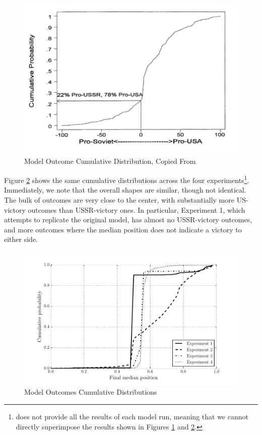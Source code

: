 \begin{figure}[h!]
  \centering
  \includegraphics[scale=0.75]{ColdWar/Figures/ColdWarOriginal}
  \caption[Original Model Cumulative Distribution]{Model Outcome Cumulative Distribution, Copied From \citet{bdm_1998} }
  \label{fig:original_cdf}
  \figSpace
 \end{figure}

Figure \ref{fig:new_cdfs} shows the same cumulative distributions across the four experiments\footnote{\citet{bdm_1998} does not provide all the results of each model run, meaning that we cannot directly superimpose the results shown in Figures \ref{fig:original_cdf} and \ref{fig:new_cdfs}.}. Immediately, we note that the overall shapes are similar, though not identical. The bulk of outcomes are very close to the center, with substantially more US-victory outcomes than USSR-victory ones. In particular, Experiment 1, which attempts to replicate the original model, has almost no USSR-victory outcomes, and more outcomes where the median position does not indicate a victory to either side.

\begin{figure}[h!]
  \centering
  \includegraphics[scale=0.5]{ColdWar/Figures/Model_cdfs}
  \caption[New Model Cumulative Distribution]{Model Outcomes Cumulative Distributions}
  \label{fig:new_cdfs}
  \figSpace
 \end{figure}


